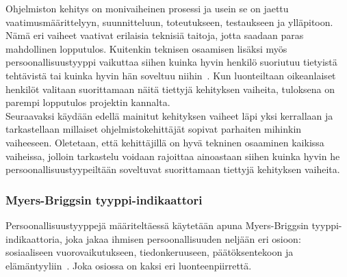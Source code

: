 \documentclass[finnish]{../tktltiki2}
\theoremstyle{definition}
\theoremstyle{remark}
\begin{document}
Ohjelmiston kehitys on monivaiheinen prosessi ja usein se on
jaettu vaatimusmäärittelyyn, suunnitteluun, toteutukseen, testaukseen
ja ylläpitoon. Nämä eri vaiheet vaativat erilaisia teknisiä taitoja,
jotta saadaan paras mahdollinen lopputulos. Kuitenkin teknisen
osaamisen lisäksi myös persoonallisuustyyppi vaikuttaa siihen kuinka
hyvin henkilö suoriutuu tietyistä tehtävistä tai kuinka hyvin hän
soveltuu niihin~\cite{Capretz:2003:PTS:766407.766410,Capretz:2010:MSS:1726559.1726574}. Kun luonteiltaan oikeanlaiset henkilöt valitaan suorittamaan
näitä tiettyjä kehityksen vaiheita, tuloksena on parempi lopputulos
projektin kannalta.\\

Seuraavaksi käydään edellä mainitut kehityksen vaiheet läpi yksi kerrallaan
ja tarkastellaan millaiset ohjelmistokehittäjät sopivat
parhaiten mihinkin vaiheeseen. Oletetaan, että kehittäjillä on
hyvä tekninen osaaminen kaikissa vaiheissa, jolloin tarkastelu
voidaan rajoittaa ainoastaan siihen kuinka hyvin he persoonallisuustyypeiltään soveltuvat suorittamaan tiettyjä
kehityksen vaiheita.

\subsubsection{Myers-Briggsin tyyppi-indikaattori}

Persoonallisuustyyppejä määriteltäessä käytetään apuna
Myers-Briggsin tyyppi-indikaattoria, joka jakaa ihmisen persoonallisuuden neljään eri osioon: sosiaaliseen vuorovaikutukseen, tiedonkeruuseen, päätöksentekoon ja elämän\-tyyliin~\cite{Capretz:2010:MSS:1726559.1726574,DaCunha:2007:PMA:1230819.1241672}. Joka osiossa on
kaksi eri luonteenpiirrettä.
\end{document}
